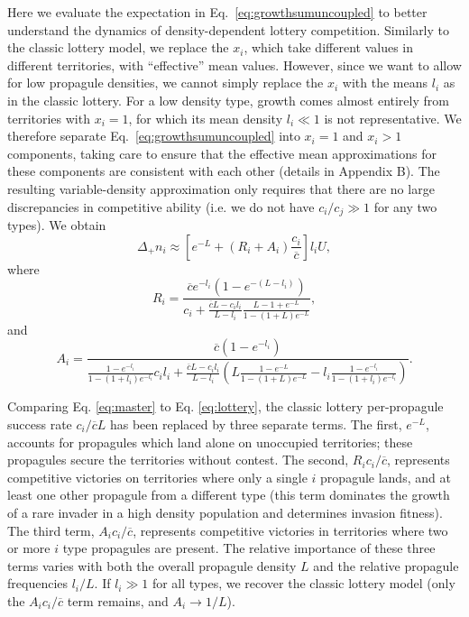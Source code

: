 \documentclass[12pt]{article}
\begin{document}
Here we evaluate the expectation in Eq.~\eqref{eq:growthsumuncoupled} to better understand the dynamics of density-dependent lottery competition. Similarly to the classic lottery model, we replace the $x_i$, which take different values in different territories, with ``effective'' mean values. However, since we want to allow for low propagule densities, we cannot simply replace the $x_i$ with the means $l_i$ as in the classic lottery. For a low density type, growth comes almost entirely from territories with $x_i=1$, for which its mean density $l_i\ll 1$ is not representative. We therefore separate Eq.~\eqref{eq:growthsumuncoupled} into $x_i=1$ and $x_i>1$ components, taking care to ensure that the effective mean approximations for these components are consistent with each other (details in Appendix B). The resulting variable-density approximation only requires that there are no large discrepancies in competitive ability (i.e. we do not have $c_i/c_j\gg 1$ for any two types). We obtain
\begin{equation}
\Delta_+ n_i\approx \left[e^{-L}+(R_i+A_i)\frac{c_i}{\overline{c}}\right]l_i U, \label{eq:master}
\end{equation}
where
\begin{equation}
R_i=\frac{\overline{c}e^{-l_i}(1-e^{-(L-l_i)})}{c_i +\frac{\overline{c}L- c_il_i}{L-l_i}\frac{L-1+e^{-L}}{1-(1+L)e^{-L}}},\nonumber \label{eq:Dr}
\end{equation}
and
\begin{equation}
A_i=\frac{\overline{c}(1-e^{-l_i})}{\frac{1-e^{-l_i}}{1-(1+l_i)e^{-l_i}}c_il_i+\frac{\overline{c}L- c_il_i}{L-l_i}\left(L\frac{1-e^{-L}}{1-(1+L)e^{-L}}-l_i\frac{1-e^{-l_i}}{1-(1+l_i)e^{-l_i}}\right)}. \nonumber \label{eq:Da}
\end{equation}

Comparing Eq. \eqref{eq:master} to Eq. \eqref{eq:lottery}, the classic lottery per-propagule success rate $c_i/\overline{c}L$ has been replaced by three separate terms. The first, $e^{-L}$, accounts for propagules which land alone on unoccupied territories; these propagules secure the territories without contest. The second, $R_i c_i/\overline{c}$, represents competitive victories on territories where only a single $i$ propagule lands, and at least one other propagule from a different type (this term dominates the growth of a rare invader in a high density population and determines invasion fitness). The third term, $A_i c_i/\overline{c}$, represents competitive victories in territories where two or more $i$ type propagules are present. The relative importance of these three terms varies with both the overall propagule density $L$ and the relative propagule frequencies $l_i/L$. If $l_i\gg 1$ for all types, we recover the classic lottery model (only the $A_ic_i/\overline{c}$ term remains, and $A_i\rightarrow 1/L$). 
\end{document}
